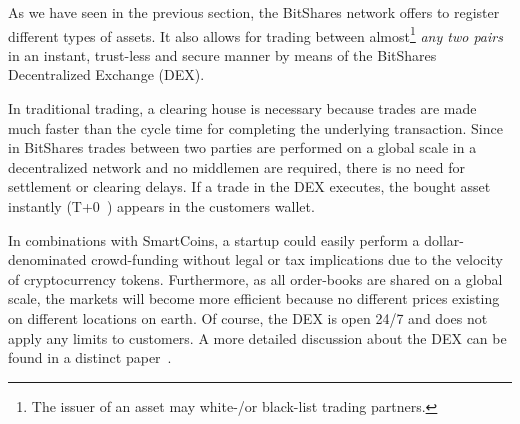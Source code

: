 As we have seen in the previous section, the BitShares network offers to
register different types of assets. It also allows for trading between
almost\footnote{The issuer of an asset may white-/or black-list trading
partners.} \emph{any two pairs} in an instant, trust-less and secure manner by
means of the BitShares Decentralized Exchange (DEX).

In traditional trading, a clearing house is necessary because trades are made
much faster than the cycle time for completing the underlying transaction.
Since in BitShares trades between two parties are performed on a global scale
in a decentralized network and no middlemen are required, there is no need for
settlement or clearing delays. If a trade in the DEX executes, the bought asset
instantly (T+0~\cite{t0}) appears in the customers wallet.

In combinations with SmartCoins, a startup could easily perform a
dollar-denominated crowd-funding without legal or tax implications due to the
velocity of cryptocurrency tokens. Furthermore, as all order-books are shared
on a global scale, the markets will become more efficient because no different
prices existing on different locations on earth. Of course, the DEX is open
24/7 and does not apply any limits to customers. A more detailed discussion
about the DEX can be found in a distinct paper~\cite{bts:financial}.
